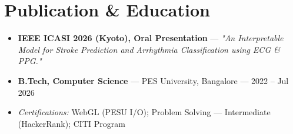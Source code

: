 \documentclass[10pt,a4paper]{article}
\begin{document}
\section*{Publication \& Education}
\begin{itemize}
\item \textbf{IEEE ICASI 2026 (Kyoto), Oral Presentation} --- \textit{"An Interpretable Model for Stroke Prediction and Arrhythmia Classification using ECG \& PPG."}
\item \textbf{B.Tech, Computer Science} --- PES University, Bangalore --- 2022 -- Jul 2026
\item \textit{Certifications:} WebGL (PESU I/O); Problem Solving --- Intermediate (HackerRank); CITI Program
\end{itemize}
\end{document}
